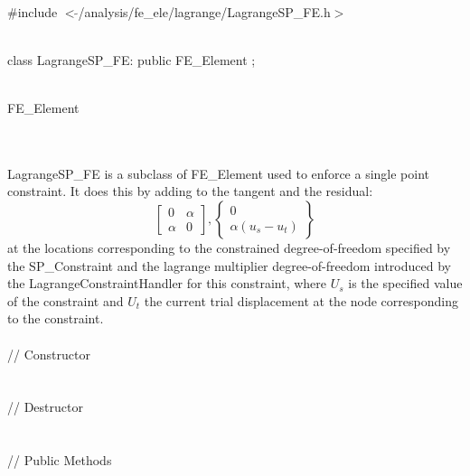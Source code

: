 
   \\
\#include $<\tilde{ }$/analysis/fe\_ele/lagrange/LagrangeSP\_FE.h$>$  


  \\
class LagrangeSP\_FE: public FE\_Element ;  


  \\
FE\_Element 

\indent{} \\ 

  \\
\indent LagrangeSP\_FE is a subclass of FE\_Element used to enforce a
single point constraint. It does this by adding to the tangent and the
residual:
\[ \left[ \begin{array}{cc} 0 & \alpha \\ \alpha & 0 \end{array}
\right] ,
\left\{ \begin{array}{c} 0 \\ \alpha(u_s - u_t) \end{array} \right\} \]
\noindent at the locations
corresponding to the constrained degree-of-freedom specified by the
SP\_Constraint and the lagrange multiplier degree-of-freedom
introduced by the LagrangeConstraintHandler for this constraint, where
$U_s$ is the specified value of the constraint 
and $U_t$ the current trial displacement at the node corresponding to
the constraint.\\

  \\
\indent\indent // Constructor  \\
\indent{} \\ \\
\indent\indent // Destructor  \\
\indent{}  \\ \\
\indent\indent // Public Methods \\
\indent{} \\  
\indent{} \\  
\indent{} \\  
\indent{}\\

